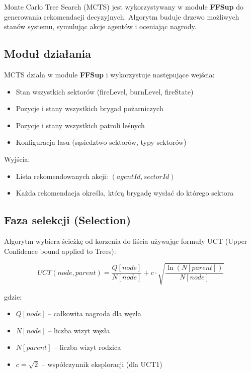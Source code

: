\documentclass[11pt,a4paper]{article}
\begin{document}
Monte Carlo Tree Search (MCTS) jest wykorzystywany w module \textbf{FFSup} do generowania rekomendacji decyzyjnych. Algorytm buduje drzewo możliwych stanów systemu, symulując akcje agentów i oceniając nagrody.

\subsection{Moduł działania}

MCTS działa w module \textbf{FFSup} i wykorzystuje następujące wejścia:
\begin{itemize}
    \item Stan wszystkich sektorów (fireLevel, burnLevel, fireState)
    \item Pozycje i stany wszystkich brygad pożarniczych
    \item Pozycje i stany wszystkich patroli leśnych
    \item Konfiguracja lasu (sąsiedztwo sektorów, typy sektorów)
\end{itemize}

Wyjścia:
\begin{itemize}
    \item Lista rekomendowanych akcji: $(agentId, sectorId)$
    \item Każda rekomendacja określa, którą brygadę wysłać do którego sektora
\end{itemize}

\subsection{Faza selekcji (Selection)}

Algorytm wybiera ścieżkę od korzenia do liścia używając formuły UCT (Upper Confidence bound applied to Trees):

\begin{equation}
UCT(node, parent) = \frac{Q[node]}{N[node]} + c \cdot \sqrt{\frac{\ln(N[parent])}{N[node]}}
\end{equation}

gdzie:
\begin{itemize}
    \item $Q[node]$ -- całkowita nagroda dla węzła
    \item $N[node]$ -- liczba wizyt węzła
    \item $N[parent]$ -- liczba wizyt rodzica
    \item $c = \sqrt{2}$ -- współczynnik eksploracji (dla UCT1)
\end{itemize}
\end{document}
